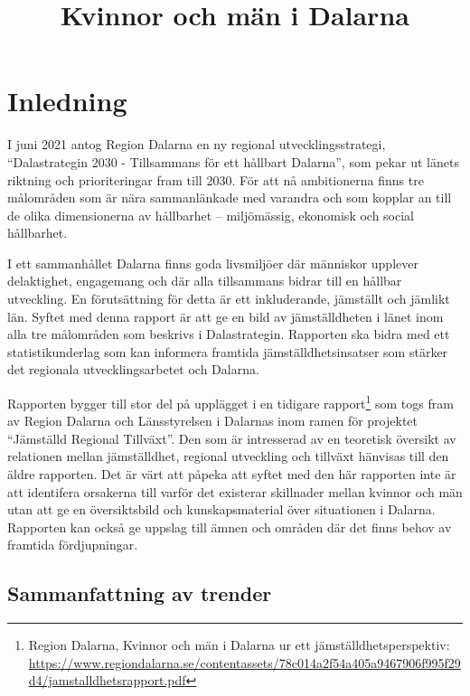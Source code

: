 \documentclass[
]{article}
\title{Kvinnor och män i Dalarna}
\author{}
\date{\vspace{-2.5em}}
\begin{document}
\maketitle

{
\setcounter{tocdepth}{6}
\tableofcontents
}
\hypertarget{inledning}{%
\section{Inledning}\label{inledning}}

I juni 2021 antog Region Dalarna en ny regional utvecklingsstrategi,
``Dalastrategin 2030 - Tillsammans för ett hållbart Dalarna'', som pekar
ut länets riktning och prioriteringar fram till 2030. För att nå
ambitionerna finns tre målområden som är nära sammanlänkade med varandra
och som kopplar an till de olika dimensionerna av hållbarhet --
miljömässig, ekonomisk och social hållbarhet.

I ett sammanhållet Dalarna finns goda livsmiljöer där människor upplever
delaktighet, engagemang och där alla tillsammans bidrar till en hållbar
utveckling. En förutsättning för detta är ett inkluderande, jämställt
och jämlikt län. Syftet med denna rapport är att ge en bild av
jämställdheten i länet inom alla tre målområden som beskrivs i
Dalastrategin. Rapporten ska bidra med ett statistikunderlag som kan
informera framtida jämställdhetsinsatser som stärker det regionala
utvecklingsarbetet och Dalarna.

Rapporten bygger till stor del på upplägget i en tidigare
rapport\footnote{Region Dalarna, Kvinnor och män i Dalarna ur ett
  jämställdhetsperspektiv:
  \url{https://www.regiondalarna.se/contentassets/78c014a2f54a405a9467906f995f29d4/jamstalldhetsrapport.pdf}}
som togs fram av Region Dalarna och Länsstyrelsen i Dalarnas inom ramen
för projektet ``Jämställd Regional Tillväxt''. Den som är intresserad av
en teoretisk översikt av relationen mellan jämställdhet, regional
utveckling och tillväxt hänvisas till den äldre rapporten. Det är värt
att påpeka att syftet med den här rapporten inte är att identifera
orsakerna till varför det existerar skillnader mellan kvinnor och män
utan att ge en översiktsbild och kunskapsmaterial över situationen i
Dalarna. Rapporten kan också ge uppslag till ämnen och områden där det
finns behov av framtida fördjupningar.

\hypertarget{sammanfattning-av-trender}{%
\subsection{Sammanfattning av trender}\label{sammanfattning-av-trender}}
\end{document}
